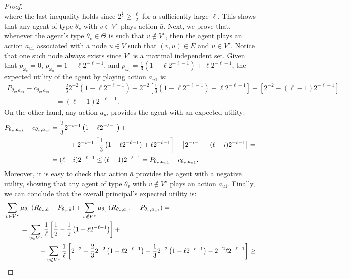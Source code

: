 \begin{proof}
\[	\]
	where the last inequality holds since $2^{\frac{\ell}{2}} \geq \frac{\ell}{2}$ for a sufficiently large $\ell$.
	This shows that any agent of type $\theta_v$ with $v \in V^\star$ plays action $\bar a$.
	Next, we prove that, whenever the agent's type $\theta_v \in \Theta$ is such that $v \notin V^\star$, then the agent plays an action $a_{u1}$ associated with a node $u \in V$ such that $(v,u) \in E$ and $u \in V^\star$.
	Notice that one such node always exists since $V^\star$ is a maximal independent set.
	Given that $p_{\bar \omega_v} = 0$, $p_{\bar \omega_{u}}= 1-\ell 2^{-\ell-1}$, and $p_{\omega_v}=\frac{1}{3} \left( 1-\ell 2^{-\ell-1} \right)+\ell 2^{-\ell-1}$, the expected utility of the agent by playing action $a_{u1}$ is:
	\begin{align*}
		P_{\theta_v, a_{u1}} - c_{\theta_v, a_{u1}} & = \frac{2}{3}2^{-2} \left( 1-\ell 2^{-\ell-1} \right) + 2^{-2} \left[ \frac{1}{3} \left( 1-\ell 2^{-\ell-1} \right) + \ell 2^{-\ell-1} \right]- \left[ 2^{-2}-(\ell-1)2^{-\ell-1} \right]=\\
		& = (\ell-1)2^{-\ell-1}.
	\end{align*}
	On the other hand, any action $a_{ui}$ provides the agent with an expected utility:
	\begin{align*}
		P_{\theta_v, a_{ui}} - c_{\theta_v, a_{ui}} &= \frac{2}{3}2^{-i-1} \left( 1-\ell 2^{-\ell-1} \right) 	+ \\
		& \textcolor{white}{=\qquad} + 2^{-i-1} \left[ \frac{1}{3} \left( 1-\ell 2^{-\ell-1} \right) + \ell 2^{-\ell-1} \right]- \left[ 2^{-i-1}-(\ell-i)2^{-\ell-1} \right] = \\
		& = (\ell-i)2^{-\ell-1}\le (\ell-1)2^{-\ell-1} = P_{\theta_v, a_{u1}} - c_{\theta_v, a_{u1}}.
	\end{align*}
	Moreover, it is easy to check that action $\bar a$ provides the agent with a negative utility, showing that any agent of type $\theta_v$ with $v \notin V^\star$ plays an action $a_{u1}$.
	Finally, we can conclude that the overall principal's expected utility is:
	\begin{align*}
		&\sum_{v \in V^\star } \mu_{\theta_v} \left( R_{\theta_v, \bar a} -P_{\theta_v, \bar a} \right) + \sum_{v \notin V^\star }  \mu_{\theta_v} \left( R_{\theta_v,  a_{u1}} -P_{\theta_v,  a_{u1}} \right)= \\
		&\qquad \,\, =\sum_{v \in V^\star } \frac{1}{\ell} \left[ \frac{1}{2}-\frac{1}{2} \left( 1-\ell 2^{-\ell-1} \right)\right] + \\
		&\qquad\,\, \textcolor{white}{=}\qquad + \sum_{v \notin V^\star } \frac{1}{\ell}  \left[  2^{-2} -\frac{2}{3}2^{-2} \left( 1-\ell 2^{-\ell-1} \right) - \frac{1}{3} 2^{-2}  \left( 1-\ell 2^{-\ell-1} \right) - 2^{-2} \ell 2^{-\ell-1}   \right] \geq \\

\end{align*}
\end{proof}
